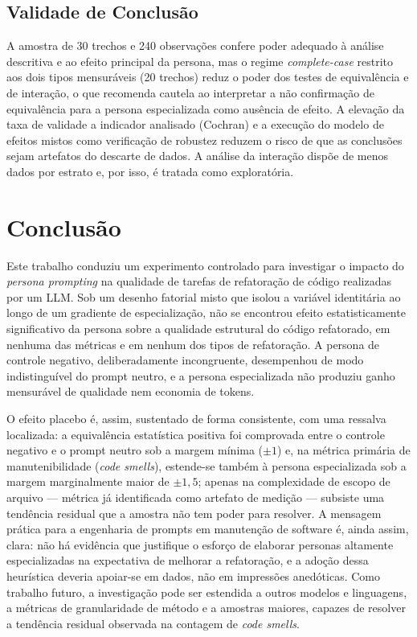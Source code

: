 \documentclass[10pt,conference,a4paper,twocolumn]{article}
\begin{document}
\subsection{Validade de Conclusão}
A amostra de 30 trechos e 240 observações confere poder adequado à análise descritiva e ao efeito principal da persona, mas o regime \textit{complete-case} restrito aos dois tipos mensuráveis (20 trechos) reduz o poder dos testes de equivalência e de interação, o que recomenda cautela ao interpretar a não confirmação de equivalência para a persona especializada como ausência de efeito. A elevação da taxa de validade a indicador analisado (Cochran) e a execução do modelo de efeitos mistos como verificação de robustez reduzem o risco de que as conclusões sejam artefatos do descarte de dados. A análise da interação dispõe de menos dados por estrato e, por isso, é tratada como exploratória.

\section{Conclusão}
Este trabalho conduziu um experimento controlado para investigar o impacto do \textit{persona prompting} na qualidade de tarefas de refatoração de código realizadas por um LLM. Sob um desenho fatorial misto que isolou a variável identitária ao longo de um gradiente de especialização, não se encontrou efeito estatisticamente significativo da persona sobre a qualidade estrutural do código refatorado, em nenhuma das métricas e em nenhum dos tipos de refatoração. A persona de controle negativo, deliberadamente incongruente, desempenhou de modo indistinguível do prompt neutro, e a persona especializada não produziu ganho mensurável de qualidade nem economia de tokens.

O efeito placebo é, assim, sustentado de forma consistente, com uma ressalva localizada: a equivalência estatística positiva foi comprovada entre o controle negativo e o prompt neutro sob a margem mínima ($\pm 1$) e, na métrica primária de manutenibilidade (\textit{code smells}), estende-se também à persona especializada sob a margem marginalmente maior de $\pm 1{,}5$; apenas na complexidade de escopo de arquivo --- métrica já identificada como artefato de medição --- subsiste uma tendência residual que a amostra não tem poder para resolver. A mensagem prática para a engenharia de prompts em manutenção de software é, ainda assim, clara: não há evidência que justifique o esforço de elaborar personas altamente especializadas na expectativa de melhorar a refatoração, e a adoção dessa heurística deveria apoiar-se em dados, não em impressões anedóticas. Como trabalho futuro, a investigação pode ser estendida a outros modelos e linguagens, a métricas de granularidade de método e a amostras maiores, capazes de resolver a tendência residual observada na contagem de \textit{code smells}.
\end{document}
